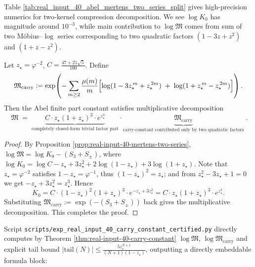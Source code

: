 \begin{remark}\label{rem:real-input-40-mertens-two-series-numeric}
Table \ref{tab:real_input_40_abel_mertens_two_series_split} gives high-precision numerics for two-kernel compression decomposition. We see
\(\log K_0\) has magnitude around \(10^{-3}\), while main contribution to \(\log\mathfrak{M}\) comes from sum of two Möbius--$\log$ series
corresponding to two quadratic factors \((1-3z+z^2)\) and \((1+z-z^2)\).

\end{remark}

\begin{theorem}\label{thm:real-input-40-carry-constant}
Let \(z_\star=\varphi^{-2}\), \(C=\frac{47+21\sqrt5}{100}\).
Define
\[
\mathfrak{M}_{\mathrm{carry}}
:=\exp\!\left(
-\sum_{m\ge 2}\frac{\mu(m)}{m}
\Bigl[
\log(1-3z_\star^{\,m}+z_\star^{\,2m})
\;+\;
\log(1+z_\star^{\,m}-z_\star^{\,2m})
\Bigr]\right).
\]
Then the Abel finite part constant satisfies multiplicative decomposition
\[
\boxed{\;
\mathfrak{M}
\;=\;
\underbrace{C\cdot z_\star(1+z_\star)^3\cdot e^{z_\star^3}}_{\text{completely closed-form trivial factor part}}
\cdot
\underbrace{\mathfrak{M}_{\mathrm{carry}}}_{\text{carry-constant contributed only by two quadratic factors}}\; }.
\]
\end{theorem}

\begin{proof}
By Proposition \ref{prop:real-input-40-mertens-two-series},
\(
\log\mathfrak{M}
=\log K_0-(S_3+S_\pm)
\),
where
\(
\log K_0=\log C-z_\star+3z_\star^2+2\log(1-z_\star)+3\log(1+z_\star)
\).
Note that \(z_\star=\varphi^{-2}\) satisfies \(1-z_\star=\varphi^{-1}\), thus \((1-z_\star)^2=z_\star\); and from \(z_\star^2-3z_\star+1=0\) we get
\(
-z_\star+3z_\star^2=z_\star^3
\).
Hence
\[
K_0=C\cdot (1-z_\star)^2(1+z_\star)^3\cdot e^{-z_\star+3z_\star^2}
=C\cdot z_\star(1+z_\star)^3\cdot e^{z_\star^3}.
\]
Substituting \(\mathfrak{M}_{\mathrm{carry}}:=\exp(-(S_3+S_\pm))\) back gives the multiplicative decomposition. This completes the proof.
\end{proof}

\begin{remark}\label{rem:real-input-40-carry-constant-certified}
Script \texttt{scripts/exp\_real\_input\_40\_carry\_constant\_certified.py} directly computes by Theorem \ref{thm:real-input-40-carry-constant}
\(\log\mathfrak{M}\), \(\log\mathfrak{M}_{\mathrm{carry}}\)
and explicit tail bound
\(
|\mathrm{tail}(N)|\le \frac{5 z_\star^{N+1}}{(N+1)(1-z_\star)}
\), outputting a directly embeddable formula block:

\end{remark}

